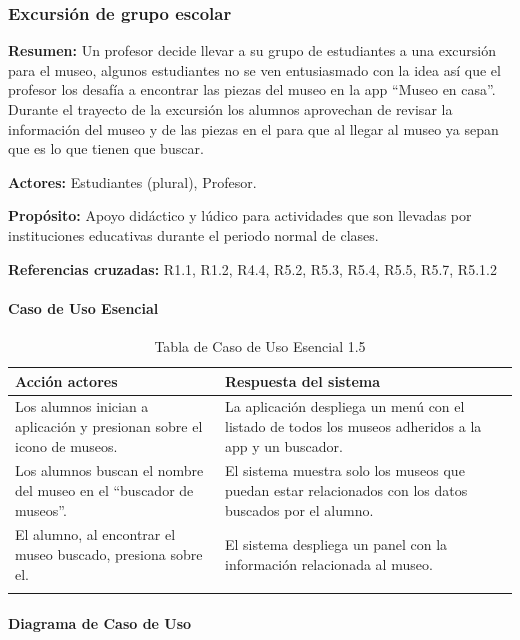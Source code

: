 \subsubsection{Excursión de grupo escolar}

{\textbf {Resumen:}}
Un profesor decide llevar a su grupo de estudiantes a una excursión para el museo, algunos estudiantes no se ven entusiasmado con la idea así que el profesor los desafía a encontrar las piezas del museo en la app “Museo en casa”. Durante el trayecto de la excursión los alumnos aprovechan de revisar la información del museo y de las piezas en el para que al llegar al museo ya sepan que es lo que tienen que buscar.

{\textbf {Actores:}}
Estudiantes (plural), Profesor.

{\textbf {Propósito:}}
Apoyo didáctico y lúdico para actividades que son llevadas por instituciones educativas durante el periodo normal de clases.

{\textbf {Referencias cruzadas:}}
R1.1, R1.2, R4.4, R5.2, R5.3, R5.4, R5.5, R5.7, R5.1.2

\paragraph{Caso de Uso Esencial}

\begin{longtable}{|p{5cm}|p{8cm}|}
\hline 
Acción actores & Respuesta del sistema \\ 
\hline 
Los alumnos inician a aplicación y presionan sobre el icono de museos. & La aplicación despliega un menú con el listado de todos los museos adheridos a la app y un buscador. \\ 
\hline 
Los alumnos buscan el nombre del museo en el “buscador de museos”. & El sistema muestra solo los museos que puedan estar relacionados con los datos buscados por el alumno. \\ 
\hline 
El alumno, al encontrar el museo buscado, presiona sobre el. & El sistema despliega un panel con la información relacionada al museo. \\ 
\hline 
\caption{Tabla de Caso de Uso Esencial 1.5}
\label{tab25}
\end{longtable}

\paragraph{Diagrama de Caso de Uso}

